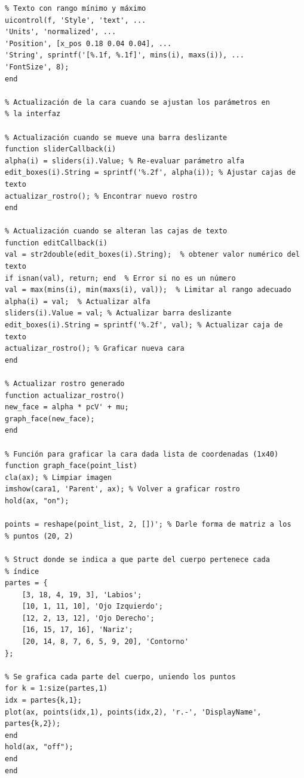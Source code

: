 \documentclass[11pt, letterpaper]{article}
\begin{document}
\begin{verbatim}
% Texto con rango mínimo y máximo
uicontrol(f, 'Style', 'text', ...
'Units', 'normalized', ...
'Position', [x_pos 0.18 0.04 0.04], ...
'String', sprintf('[%.1f, %.1f]', mins(i), maxs(i)), ...
'FontSize', 8);
end

% Actualización de la cara cuando se ajustan los parámetros en
% la interfaz

% Actualización cuando se mueve una barra deslizante
function sliderCallback(i)
alpha(i) = sliders(i).Value; % Re-evaluar parámetro alfa
edit_boxes(i).String = sprintf('%.2f', alpha(i)); % Ajustar cajas de texto
actualizar_rostro(); % Encontrar nuevo rostro
end

% Actualización cuando se alteran las cajas de texto
function editCallback(i)
val = str2double(edit_boxes(i).String);  % obtener valor numérico del texto
if isnan(val), return; end  % Error si no es un número
val = max(mins(i), min(maxs(i), val));  % Limitar al rango adecuado
alpha(i) = val;  % Actualizar alfa
sliders(i).Value = val; % Actualizar barra deslizante
edit_boxes(i).String = sprintf('%.2f', val); % Actualizar caja de texto
actualizar_rostro(); % Graficar nueva cara
end

% Actualizar rostro generado
function actualizar_rostro()
new_face = alpha * pcV' + mu;
graph_face(new_face);
end

% Función para graficar la cara dada lista de coordenadas (1x40)
function graph_face(point_list)
cla(ax); % Limpiar imagen
imshow(cara1, 'Parent', ax); % Volver a graficar rostro
hold(ax, "on");

points = reshape(point_list, 2, [])'; % Darle forma de matriz a los 
% puntos (20, 2)

% Struct donde se indica a que parte del cuerpo pertenece cada
% índice
partes = {
	[3, 18, 4, 19, 3], 'Labios';
	[10, 1, 11, 10], 'Ojo Izquierdo';
	[12, 2, 13, 12], 'Ojo Derecho';
	[16, 15, 17, 16], 'Nariz';
	[20, 14, 8, 7, 6, 5, 9, 20], 'Contorno'
};

% Se grafica cada parte del cuerpo, uniendo los puntos 
for k = 1:size(partes,1)
idx = partes{k,1};
plot(ax, points(idx,1), points(idx,2), 'r.-', 'DisplayName', partes{k,2});
end
hold(ax, "off");
end
end
\end{verbatim}
\end{document}
